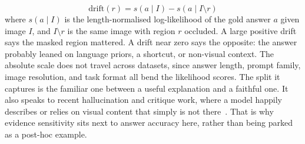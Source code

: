\documentclass[preprint,12pt]{elsarticle}
\begin{document}
\begin{equation}
    \mathrm{drift}(r) = s\!\left(a \mid I\right) - s\!\left(a \mid I \setminus r\right)
    \label{Eq:Drift}
\end{equation}
where $s(a \mid I)$ is the length-normalised log-likelihood of the gold answer $a$ given image $I$, and $I \setminus r$ is the same image with region $r$ occluded.
A large positive drift says the masked region mattered.
A drift near zero says the opposite: the answer probably leaned on language priors, a shortcut, or non-visual context.
The absolute scale does not travel across datasets, since answer length, prompt family, image resolution, and task format all bend the likelihood scores.
The split it captures is the familiar one between a useful explanation and a faithful one.
It also speaks to recent hallucination and critique work, where a model happily describes or relies on visual content that simply is not there~\cite{guan2024hallusionbench,jiang2024hacl,wu2025visco,zhang2025criticv}.
That is why evidence sensitivity sits next to answer accuracy here, rather than being parked as a post-hoc example.
\end{document}
